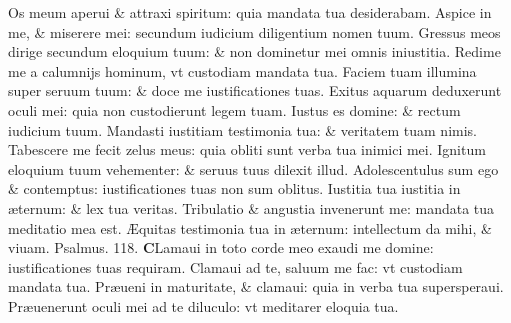 \documentclass[a5paper,10pt]{book}
\def\ae{æ}
\def\AE{Æ}
\begin{document}
\begin{multicols*}{2}
\newline \color{red} O\color{black}s meum aperui \& attraxi spiritum: quia mandata tua desiderabam.
\newline \color{red} A\color{black}spice in me, \& miserere mei: secundum iudicium diligentium nomen tuum.
\newline \color{red} G\color{black}ressus meos dirige secundum eloquium tuum: \& non dominetur mei omnis iniustitia.
\newline \color{red} R\color{black}edime me a calumnijs hominum, vt custodiam mandata tua.
\newline \color{red} F\color{black}aciem tuam illumina super seruum tuum: \& doce me iustificationes tuas.
\newline \color{red} E\color{black}xitus aquarum deduxerunt oculi mei: quia non custodierunt legem tuam.
\newline \color{red} I\color{black}ustus es domine: \& rectum iudicium tuum.
\newline \color{red} M\color{black}andasti iustitiam testimonia tua: \& veritatem tuam nimis.
\newline \color{red} T\color{black}abescere me fecit zelus meus: quia obliti sunt verba tua inimici mei.
\newline \color{red} I\color{black}gnitum eloquium tuum vehementer: \& seruus tuus dilexit illud.
\newline \color{red} A\color{black}dolescentulus sum ego \& contemptus: iustificationes tuas non sum oblitus.
\newline \color{red} I\color{black}ustitia tua iustitia in \ae ternum: \& lex tua veritas.
\newline \color{red} T\color{black}ribulatio \& angustia invenerunt me: mandata tua meditatio mea est.
\newline \color{red} \AE \color{black}quitas testimonia tua in \ae ternum: intellectum da mihi, \& viuam. \quad \color{red} Psalmus. 118. \color{black}
\vspace{-.5em}
\lettrine[lines=2]{\bfseries \color{red} C}{}Lamaui in toto corde meo exaudi me domine: iustificationes tuas requiram.
\newline \color{red} C\color{black}lamaui ad te, saluum me fac: vt custodiam mandata tua.
\newline \color{red} P\color{black}r\ae ueni in maturitate, \& clamaui: quia in verba tua supersperaui.
\newline \color{red} P\color{black}r\ae uenerunt oculi mei ad te diluculo: vt meditarer eloquia tua.

\end{multicols*}
\end{document}

